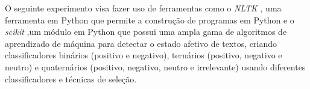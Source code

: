 O seguinte experimento visa fazer uso de ferramentas como o \textit{NLTK} \cite{bird2006nltk}, uma ferramenta em Python que permite a construção de programas em Python e o \textit{scikit} \cite{pedregosa2011scikit},um módulo em Python que possui uma ampla gama de algoritmos de aprendizado de máquina para detectar o estado afetivo de textos, criando classificadores binários (positivo e negativo), ternários (positivo, negativo e neutro) e quaternários (positivo, negativo, neutro e irrelevante) usando diferentes classificadores e técnicas de seleção.